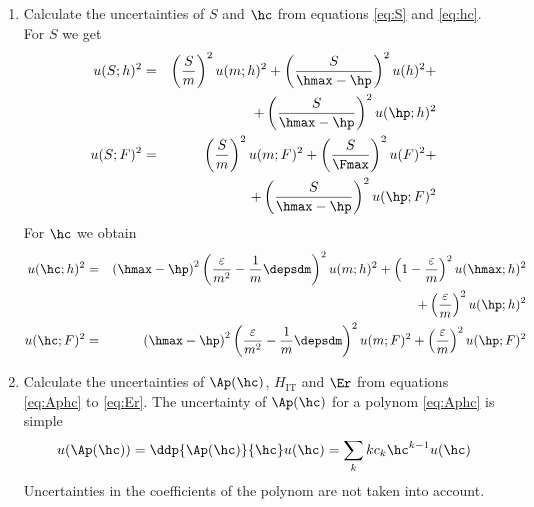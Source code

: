 \begin{enumerate}
 \item \label{op_unc_S_hc}
 Calculate the uncertainties of $S$ and $\hc$  from equations \eqref{eq:S} and \eqref{eq:hc}.\\
 For $S$ we get
\begin{eqnarray}
 u(S;h)^2 &=& 
 \left( \frac{S}{m}\right)^2 u(m;h)^2 + 
 \left( \frac{S}{\hmax-\hp} \right)^2 u(h)^2 + \nonumber \\ 
  &&+ \left( \frac{S}{\hmax- \hp}\right)^2 u(\hp;h)^2 \\
    u(S;F)^2 &=& 
 \left( \frac{S}{m}\right)^2 u(m;F)^2 + 
 \left( \frac{S}{\Fmax} \right)^2 u(F)^2 + \nonumber \\ 
    &&+ \left( \frac{S}{\hmax- \hp}\right)^2 u(\hp;F)^2   \nonumber \\
 \end{eqnarray}
For $\hc$ we obtain
  \begin{eqnarray}
u(\hc;h)^2 &=& 
   \left( \hmax - \hp \right)^2 \left( \frac{\varepsilon}{m^2} - \frac1m \depsdm \right)^2 u(m;h)^2 + 
 \left( 1- \frac{\varepsilon}{m}\right)^2 u(\hmax;h)^2 
 \\  &&  +\left(\frac{\varepsilon }{m} \right)^2 u(\hp;h)^2  \nonumber   \\
u(\hc;F)^2 &=& 
   \left( \hmax - \hp \right)^2 \left( \frac{\varepsilon}{m^2} - \frac1m \depsdm \right)^2 u(m;F)^2 + 
  \left(\frac{\varepsilon }{m} \right)^2 u(\hp;F)^2    
  \end{eqnarray}

 \item \label{op_unc_A}
 Calculate the uncertainties of $\Ap(\hc)$, $H_{\mathrm{IT}}$ and $\Er$ from equations \eqref{eq:Aphc} to \eqref{eq:Er}.
 The uncertainty of $\Ap(\hc)$ for a polynom \eqref{eq:Aphc} is simple
 \begin{equation}
  u(\Ap(\hc)) = \ddp{ \Ap(\hc)}{\hc} u(\hc) =  \sum_{k} k c_k \hc^{k-1} u(\hc)
 \end{equation}
Uncertainties in the coefficients of the polynom are not taken into account. \\


\end{enumerate}
